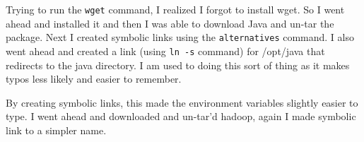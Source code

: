 \documentclass[10pt]{article}
\begin{document}
\par
Trying to run the \verb|wget| command, I realized I forgot to install wget. So I went ahead and installed it and then I was able to download Java and un-tar the package. Next I created symbolic links using the \verb|alternatives| command. I also went ahead and created a link (using \verb|ln -s| command) for /opt/java that redirects to the java directory. I am used to doing this sort of thing as it makes typos less likely and easier to remember.
\par
{}%
\hfill
{}%
\par
By creating symbolic links, this made the environment variables slightly easier to type. I went ahead and downloaded and un-tar'd hadoop, again I made symbolic link to a simpler name.
\par
{}%
\end{document}
